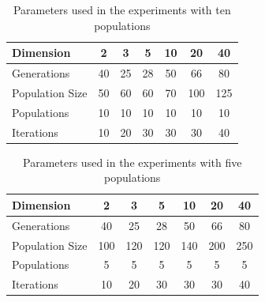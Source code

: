 \documentclass[review]{elsarticle}
\begin{document}
\begin{table}
    \small
    \caption{Parameters used in the experiments with ten populations
    }
    \label{tab:params:10}
    \vspace{0.25cm}
    \centering
    \small
    \begin{tabular}{|l|c|c|c|c|c|c|}
      \hline
      Dimension        & 2  & 3  & 5  & 10 & 20  & 40  \\ \hline
      Generations      & 40 & 25 & 28 & 50 & 66  & 80  \\ \hline
      Population Size  & 50 & 60 & 60 & 70 & 100 & 125 \\ \hline
      Populations      & 10 & 10 & 10 & 10 & 10  & 10  \\ \hline
      Iterations       & 10 & 20 & 30 & 30 & 30  & 40  \\ \hline  
    \end{tabular}
\end{table}

\begin{table}
    \small
    \caption{Parameters used in the experiments with five populations
    }
    \label{tab:params:5}
    \vspace{0.25cm}
    \centering
    \small
    \begin{tabular}{|l|c|c|c|c|c|c|}
      \hline
      Dimension        & 2  & 3  & 5  & 10 & 20  & 40  \\ \hline
      Generations      & 40 & 25 & 28 & 50 & 66  & 80  \\ \hline
      Population Size  & 100 & 120 & 120 & 140 & 200 & 250 \\ \hline
      Populations      & 5 & 5 & 5 & 5 & 5  & 5  \\ \hline
      Iterations       & 10 & 20 & 30 & 30 & 30  & 40  \\ \hline  
    \end{tabular}
\end{table}

% 


\end{document}
